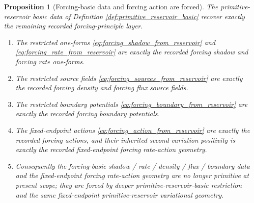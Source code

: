 \documentclass[11pt]{article}
\newtheorem{proposition}{Proposition}
\begin{document}
\begin{proposition}[Forcing-basic data and forcing action are forced]
\label{prop:forcing_basic_forced}
The primitive-reservoir basic data of Definition \ref{def:primitive_reservoir_basic} recover exactly the remaining recorded forcing-principle layer.
\begin{enumerate}
    \item The restricted one-forms \eqref{eq:forcing_shadow_from_reservoir} and \eqref{eq:forcing_rate_from_reservoir} are exactly the recorded forcing shadow and forcing rate one-forms.
    \item The restricted source fields \eqref{eq:forcing_sources_from_reservoir} are exactly the recorded forcing density and forcing flux source fields.
    \item The restricted boundary potentials \eqref{eq:forcing_boundary_from_reservoir} are exactly the recorded forcing boundary potentials.
    \item The fixed-endpoint actions \eqref{eq:forcing_action_from_reservoir} are exactly the recorded forcing actions, and their inherited second-variation positivity is exactly the recorded fixed-endpoint forcing rate-action geometry.
    \item Consequently the forcing-basic shadow / rate / density / flux / boundary data and the fixed-endpoint forcing rate-action geometry are no longer primitive at present scope; they are forced by deeper primitive-reservoir-basic restriction and the same fixed-endpoint primitive-reservoir variational geometry.
\end{enumerate}
\end{proposition}
\end{document}
